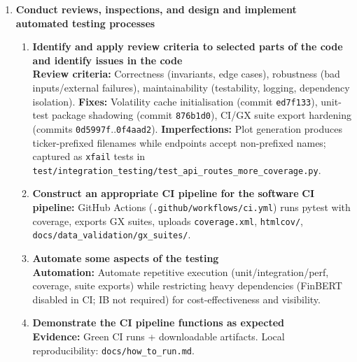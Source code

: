 \documentclass[11pt]{article}
\begin{document}
\begin{enumerate}
\begin{enumerate}
\item \textbf{Discussion of what would be necessary to achieve the target level}\\
\textbf{Achievement:} Coverage 76\% overall (local), \texttt{api/routes.py} 80\%, \newline \texttt{services/sentimentService.py} 86\% (up from 61\%), \texttt{controllers/ServiceController.py} 67\%, \texttt{services/vpin\_service.py} 96\%. \textbf{To reach 80\%:} target gaps in \texttt{services/vol\_service.py} (66\%), \texttt{services/hmm\_regime\_service.py} (65\%), \texttt{controllers/ServiceController.py} (67\%) with additional edge case/error path tests. Extend stress tests; add contract tests with mocks.
\end{enumerate}
\item \textbf{Conduct reviews, inspections, and design and implement automated testing processes} \marginpar{[default 20\%]}
\begin{enumerate}    
\item \textbf{Identify and apply review criteria to selected parts of the code and identify issues in the code}\\
\textbf{Review criteria:} Correctness (invariants, edge cases), robustness (bad inputs/external failures), maintainability (testability, logging, dependency isolation). \textbf{Fixes:} Volatility cache initialisation (commit \texttt{ed7f133}), unit-test package shadowing (commit \texttt{876b1d0}), CI/GX suite export hardening (commits \texttt{0d5997f}..\texttt{0f4aad2}). \textbf{Imperfections:} Plot generation produces ticker-prefixed filenames while endpoints accept non-prefixed names; captured as \texttt{xfail} tests in \newline \texttt{test/integration\_testing/test\_api\_routes\_more\_coverage.py}.

\item \textbf{Construct an appropriate CI pipeline for the software}
\textbf{CI pipeline:} \newline GitHub Actions (\texttt{.github/workflows/ci.yml}) runs pytest with coverage, exports GX suites, uploads \texttt{coverage.xml}, \texttt{htmlcov/}, \texttt{docs/data\_validation/gx\_suites/}.

\item\textbf{Automate some aspects of the testing}\\
\textbf{Automation:} Automate repetitive execution (unit/integration/perf, coverage, suite exports) while restricting heavy dependencies (FinBERT disabled in CI; IB not required) for cost-effectiveness and visibility.

\item \textbf{Demonstrate the CI pipeline functions as expected}\\
\textbf{Evidence:} Green CI runs + downloadable artifacts. Local reproducibility: \texttt{docs/how\_to\_run.md}.
\end{enumerate}
\end{enumerate}
\end{document}
